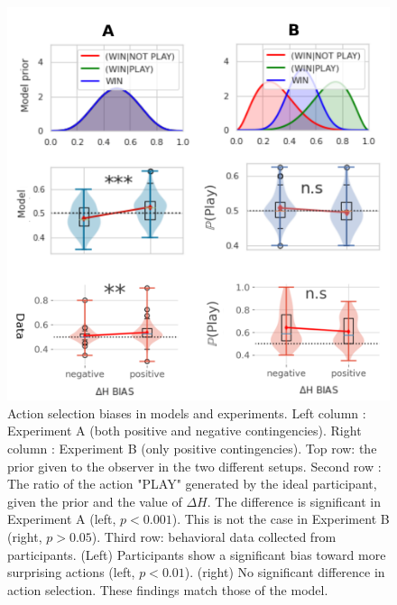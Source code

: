 \documentclass[10pt,letterpaper]{article}
\begin{document}
\begin{figure}[t!]
\includegraphics[width=.8\linewidth]{figs/cosyne_analysis.png}

\caption{{Action selection biases in models and experiments}. Left column : Experiment A (both positive and negative contingencies). Right column : Experiment B (only positive contingencies). Top row: the prior given to the observer in the two different setups. 
Second row : The ratio of the action "PLAY" generated by the ideal participant, given the prior and the value of $\Delta H$. The difference is significant in Experiment A (left, $p<0.001$). %
This is not the case in Experiment B (right, $p>0.05$). Third row: behavioral data collected from participants. (Left) Participants show a significant bias toward more surprising actions (left, $p<0.01$).  (right) No significant difference in action selection. These findings match those of the model.
}
\label{fig:data}
\end{figure}

\end{document}

